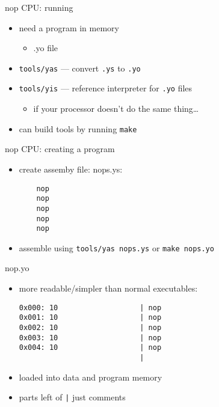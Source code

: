 \begin{frame}{nop CPU: running}
    \begin{itemize}
    \item need a program in memory
        \begin{itemize}
        \item .yo file
        \end{itemize}
    \item {\tt tools/yas} --- convert {\tt .ys}  to {\tt .yo}
    \item {\tt tools/yis} --- reference interpreter for {\tt .yo} files
        \begin{itemize}
        \item if your processor doesn't do the same thing\ldots
        \end{itemize}
    \item can build tools by running {\tt make}
    \end{itemize}
\end{frame}

\begin{frame}[fragile,label=makeProgram]{nop CPU: creating a program}
    \begin{itemize}
    \item create assemby file: nops.ys:
\begin{Verbatim}
    nop
    nop
    nop
    nop
    nop
\end{Verbatim}
    \item assemble using {\tt tools/yas nops.ys} or {\tt make nops.yo}
    \end{itemize}
\end{frame}

\begin{frame}[fragile,label=nopYo]{nop.yo}
    \begin{itemize}
    \item more readable/simpler than normal executables:
\begin{Verbatim}
0x000: 10                   | nop
0x001: 10                   | nop
0x002: 10                   | nop
0x003: 10                   | nop
0x004: 10                   | nop
                            | 
\end{Verbatim}
    \item loaded into data and program memory
    \item parts left of {\tt |} just comments
    \end{itemize}
\end{frame}

